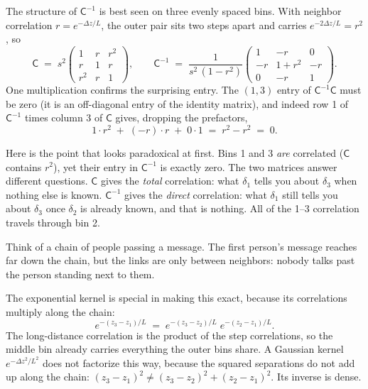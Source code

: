 \documentclass[11pt]{article}
\newcommand{\Cov}{\mathsf{C}}
\begin{document}
The structure of $\Cov^{-1}$ is best seen on three evenly spaced bins.
With neighbor correlation $r = e^{-\Delta z / L}$, the outer pair sits
two steps apart and carries $e^{-2\Delta z / L} = r^2$, so
\begin{equation}
  \Cov \;=\; s^2
  \begin{pmatrix} 1 & r & r^2 \\ r & 1 & r \\ r^2 & r & 1 \end{pmatrix},
  \qquad
  \Cov^{-1} \;=\; \frac{1}{s^2\,(1 - r^2)}
  \begin{pmatrix} 1 & -r & 0 \\ -r & 1 + r^2 & -r \\ 0 & -r & 1
  \end{pmatrix}.
  \label{eq:threebin}
\end{equation}
One multiplication confirms the surprising entry.  The $(1,3)$ entry of
$\Cov^{-1}\Cov$ must be zero (it is an off-diagonal entry of the
identity matrix), and indeed row 1 of $\Cov^{-1}$ times column 3 of
$\Cov$ gives, dropping the prefactors,
\begin{equation}
  1 \cdot r^2 \;+\; (-r) \cdot r \;+\; 0 \cdot 1
  \;=\; r^2 - r^2 \;=\; 0 .
  \label{eq:rowcheck}
\end{equation}

Here is the point that looks paradoxical at first.  Bins 1 and 3
\emph{are} correlated ($\Cov$ contains $r^2$), yet their entry in
$\Cov^{-1}$ is exactly zero.  The two matrices answer different
questions.  $\Cov$ gives the \emph{total} correlation: what $\delta_1$
tells you about $\delta_3$ when nothing else is known.  $\Cov^{-1}$
gives the \emph{direct} correlation: what $\delta_1$ still tells you
about $\delta_3$ once $\delta_2$ is already known, and that is
nothing.  All of the 1--3 correlation travels through bin 2.

Think of a chain of people passing a message.  The first person's
message reaches far down the chain, but the links are only between
neighbors: nobody talks past the person standing next to them.

The exponential kernel is special in making this exact, because its
correlations multiply along the chain:
\begin{equation}
  e^{-(z_3 - z_1)/L}
  \;=\;
  e^{-(z_3 - z_2)/L}\; e^{-(z_2 - z_1)/L} .
  \label{eq:factorize}
\end{equation}
The long-distance correlation is the product of the step correlations,
so the middle bin already carries everything the outer bins share.  A
Gaussian kernel $e^{-\Delta z^2 / L^2}$ does not factorize this way,
because the squared separations do not add up along the chain:
$(z_3 - z_1)^2 \neq (z_3 - z_2)^2 + (z_2 - z_1)^2$.  Its inverse
is dense.
\end{document}
